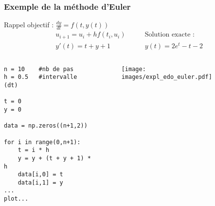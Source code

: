\documentclass{beamer}
\begin{document}
\begin{frame}[fragile]
\frametitle{Exemple de la méthode d'Euler}
Rappel objectif : $\frac{dy}{dt} = f(t,y(t))$\\
\vspace{-0.2cm}
\begin{align*}
& u_{i+1} = u_i + hf(t_i,u_i) \qquad & \text{Solution exacte :} \\
& y'(t) = t + y + 1 & y(t) = 2e^t-t-2
\end{align*}

\begin{columns}[t]
\begin{column}{0.5\textwidth}
\begin{lstlisting}[language=pers_py, frame=0, numbers=none, basicstyle=\ttfamily\scriptsize]
n = 10    #nb de pas
h = 0.5   #intervalle (dt)

t = 0
y = 0

data = np.zeros((n+1,2))

for i in range(0,n+1):
	t = i * h
	y = y + (t + y + 1) * h
	data[i,0] = t
	data[i,1] = y
...
plot...
\end{lstlisting}
\end{column}
%
\begin{column}{0.55\textwidth}
\begin{figure}[t]
\texttt{[image: images/expl\_edo\_euler.pdf]}
\end{figure}
\vfill
\end{column}
\end{columns}
\end{frame}
\end{document}
